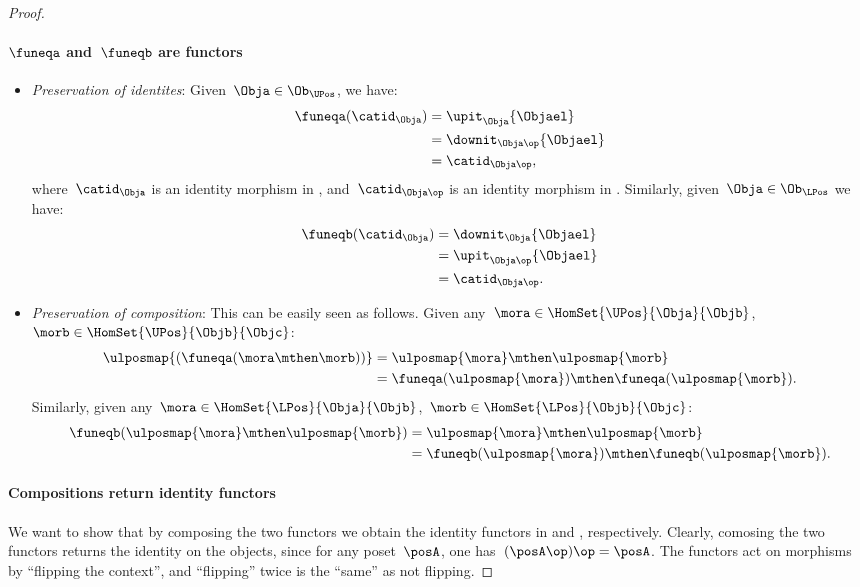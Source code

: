 \begin{proof}
\paragraph*{$\funeqa$ and~$\funeqb$ are functors}
\begin{itemize}
    \item \emph{Preservation of identites}: Given~$\Obja\in \Ob_{\UPos}$, we have:
    \begin{equation*}
        \begin{aligned}
            \funeqa(\catid_\Obja)&=\upit_\Obja\{\Objael\}\\
            &=\downit_{\Obja\op}\{\Objael\}\\
            &=\catid_{\Obja\op},
        \end{aligned}
    \end{equation*}
where~$\catid_\Obja$ is an identity morphism in \UPos, and~$\catid_{\Obja\op}$ is an identity morphism in \LPos. Similarly, given~$\Obja\in \Ob_{\LPos}$ we have:
\begin{equation*}
    \begin{aligned}
    \funeqb(\catid_\Obja)&=\downit_\Obja\{\Objael\}\\
    &=\upit_{\Obja\op}\{\Objael\}\\
    &=\catid_{\Obja\op}.
    \end{aligned}
\end{equation*}
\item \emph{Preservation of composition}: This can be easily seen as follows. Given any~$\mora\in \HomSet{\UPos}{\Obja}{\Objb}$,~$\morb\in \HomSet{\UPos}{\Objb}{\Objc}$:
\begin{equation*}
    \begin{aligned}
    \ulposmap{(\funeqa(\mora \mthen \morb))}&=\ulposmap{\mora} \mthen \ulposmap{\morb}\\
    &=\funeqa(\ulposmap{\mora})\mthen \funeqa(\ulposmap{\morb}).
    \end{aligned}
\end{equation*}
Similarly, given any~$\mora\in \HomSet{\LPos}{\Obja}{\Objb}$,~$\morb\in \HomSet{\LPos}{\Objb}{\Objc}$:
\begin{equation*}
    \begin{aligned}
    \funeqb(\ulposmap{\mora} \mthen \ulposmap{\morb})&=\ulposmap{\mora} \mthen\ulposmap{\morb}\\
    &=\funeqb(\ulposmap{\mora})\mthen \funeqb(\ulposmap{\morb}).
    \end{aligned}
\end{equation*}
\end{itemize}
\paragraph*{Compositions return identity functors}
We want to show that by composing the two functors we obtain the identity functors in \UPos and \LPos, respectively. Clearly, comosing the two functors returns the identity on the objects, since for any poset~$\posA$, one has~$(\posA\op)\op=\posA$. The functors act on morphisms by ``flipping the context'', and ``flipping'' twice is the ``same'' as not flipping.
\end{proof}

